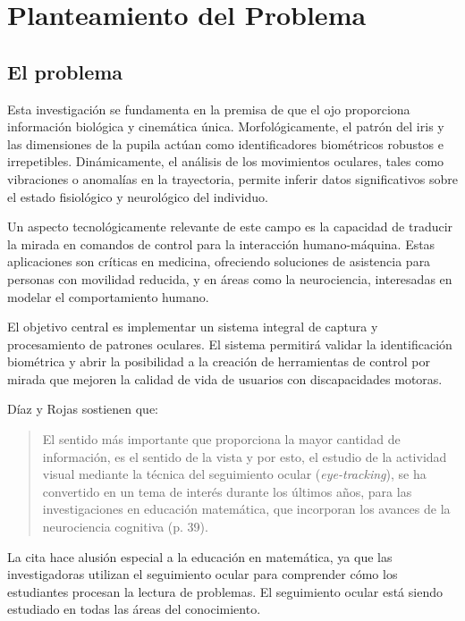 \chapter{Planteamiento del Problema}

\section{El problema}

Esta investigación se fundamenta en la premisa de que el ojo proporciona información biológica y cinemática única. Morfológicamente, el patrón del iris y las dimensiones de la pupila actúan como identificadores biométricos robustos e irrepetibles. Dinámicamente, el análisis de los movimientos oculares, tales como vibraciones o anomalías en la trayectoria, permite inferir datos significativos sobre el estado fisiológico y neurológico del individuo.

Un aspecto tecnológicamente relevante de este campo es la capacidad de traducir la mirada en comandos de control para la interacción humano-máquina. Estas aplicaciones son críticas en medicina, ofreciendo soluciones de asistencia para personas con movilidad reducida, y en áreas como la neurociencia, interesadas en modelar el comportamiento humano.

El objetivo central es implementar un sistema integral de captura y procesamiento de patrones oculares. El sistema permitirá validar la identificación biométrica y abrir la posibilidad a la creación de herramientas de control por mirada que mejoren la calidad de vida de usuarios con discapacidades motoras.

Díaz y Rojas \cite{diaz2021} sostienen que:

\begin{quote}
	El sentido más importante que proporciona la mayor cantidad de información, es el sentido de la vista y por esto, el estudio de la actividad visual mediante la técnica del seguimiento ocular (\textit{eye-tracking}), se ha convertido en un tema de interés durante los últimos años, para las investigaciones en educación matemática, que incorporan los avances de la neurociencia cognitiva (p. 39).
\end{quote}

La cita hace alusión especial a la educación en matemática, ya que las investigadoras utilizan el seguimiento ocular para comprender cómo los estudiantes procesan la lectura de problemas. El seguimiento ocular está siendo estudiado en todas las áreas del conocimiento.

